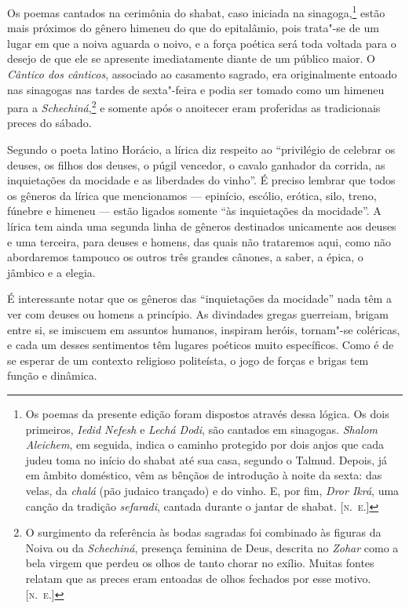 Os poemas cantados na cerimônia do shabat, caso iniciada na sinagoga,\footnote{Os poemas da presente edição foram dispostos através dessa lógica. Os dois primeiros, \emph{Iedid Nefesh} e \emph{Lechá Dodi}, são cantados em sinagogas. \emph{Shalom Aleichem}, em seguida, indica o caminho protegido por dois anjos que cada judeu toma no início do shabat até sua casa, segundo o Talmud. Depois, já em âmbito doméstico, vêm as bênçãos de introdução à noite da sexta: das velas, da \emph{chalá} (pão judaico trançado) e do vinho. E, por fim, \emph{Dror Ikrá}, uma canção da tradição \emph{sefaradi}, cantada durante o jantar de shabat. [\textsc{n.~e}.]}
estão mais próximos do gênero himeneu do que do epitalâmio, pois
trata"-se de um lugar em que a noiva aguarda o noivo, e a força poética
será toda voltada para o desejo de que ele se apresente imediatamente
diante de um público maior. O \emph{Cântico dos cânticos}, associado ao
casamento sagrado, era originalmente entoado nas sinagogas nas tardes de
sexta"-feira e podia ser tomado como um himeneu para a \emph{Schechiná},\footnote{O surgimento da referência às bodas sagradas foi combinado às figuras da Noiva ou da \emph{Schechiná}, presença feminina de Deus, descrita no \emph{Zohar} como a bela virgem que perdeu os olhos de tanto chorar no exílio. Muitas fontes relatam que as preces eram entoadas de olhos fechados por esse motivo. [\textsc{n.~e}.]}
e somente após o anoitecer eram proferidas as tradicionais preces do
sábado.

Segundo o poeta latino Horácio, a lírica diz respeito ao ``privilégio de
celebrar os deuses, os filhos dos deuses, o púgil vencedor, o cavalo
ganhador da corrida, as inquietações da mocidade e as liberdades
do vinho''. É preciso lembrar que todos os gêneros da lírica que
mencionamos --- epinício, escólio, erótica, silo, treno, fúnebre e
himeneu --- estão ligados somente ``às inquietações da
mocidade''. A lírica tem ainda uma segunda linha de gêneros destinados unicamente aos
deuses e uma terceira, para deuses e homens, das quais não trataremos
aqui, como não abordaremos tampouco os outros três grandes cânones, a
saber, a épica, o jâmbico e a elegia.

É interessante notar que os gêneros das ``inquietações da mocidade'' nada
têm a ver com deuses ou homens a princípio. As divindades gregas
guerreiam, brigam entre si, se imiscuem em assuntos humanos, inspiram
heróis, tornam"-se coléricas, e cada um desses sentimentos têm lugares
poéticos muito específicos. Como é de se esperar de um contexto
religioso politeísta, o jogo de forças e brigas tem função e dinâmica.

